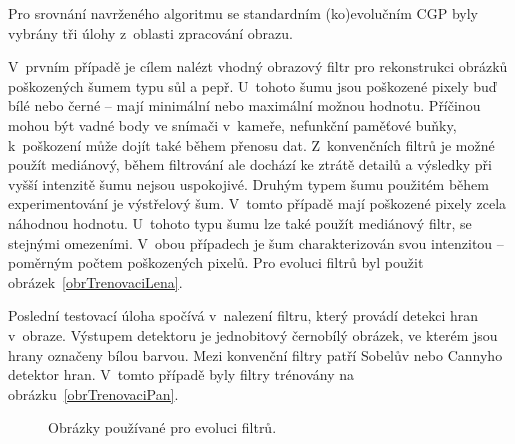 Pro srovnání navrženého algoritmu se standardním (ko)evolučním CGP byly vybrány tři úlohy z~oblasti zpracování obrazu.

V~prvním případě je cílem nalézt vhodný obrazový filtr pro rekonstrukci obrázků poškozených šumem typu sůl a pepř. U~tohoto šumu jsou poškozené pixely buď bílé nebo černé -- mají minimální nebo maximální možnou hodnotu. Příčinou mohou být vadné body ve snímači v~kameře, nefunkční paměťové buňky, k~poškození může dojít také během přenosu dat. Z~konvenčních filtrů je možné použít mediánový, během filtrování ale dochází ke ztrátě detailů a výsledky při vyšší intenzitě šumu nejsou uspokojivé. Druhým typem šumu použitém během experimentování je výstřelový šum. V~tomto případě mají poškozené pixely zcela náhodnou hodnotu. U~tohoto typu šumu lze také použít mediánový filtr, se stejnými omezeními. V~obou případech je šum charakterizován svou intenzitou -- poměrným počtem poškozených pixelů. Pro evoluci filtrů byl použit obrázek~\ref{obrTrenovaciLena}.

Poslední testovací úloha spočívá v~nalezení filtru, který provádí detekci hran v~obraze. Výstupem detektoru je jednobitový černobílý obrázek, ve kterém jsou hrany označeny bílou barvou. Mezi konvenční filtry patří Sobelův nebo Cannyho detektor hran. V~tomto případě byly filtry trénovány na obrázku~\ref{obrTrenovaciPan}.

\begin{figure}[htb]
    \centering
    \caption{Obrázky používané pro evoluci filtrů.}
    \label{obrTrenovaci}
\end{figure}

